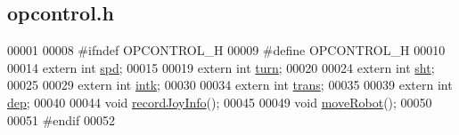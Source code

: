 \hypertarget{opcontrol_8h_source}{}\subsection{opcontrol.\+h}
\label{opcontrol_8h_source}

\begin{DoxyCode}
00001 
00008 \textcolor{preprocessor}{#ifndef OPCONTROL\_H}
00009 \textcolor{preprocessor}{#define OPCONTROL\_H}
00010 
00014 \textcolor{keyword}{extern} \textcolor{keywordtype}{int} \hyperlink{opcontrol_8h_a642ce334330c8b0f6e33dd0a3fa65111}{spd};
00015 
00019 \textcolor{keyword}{extern} \textcolor{keywordtype}{int} \hyperlink{opcontrol_8h_aaefa47f4fdf865c2358c22b542a993e4}{turn};
00020 
00024 \textcolor{keyword}{extern} \textcolor{keywordtype}{int} \hyperlink{opcontrol_8h_ab9078d4ef28960b548a1621e2f6e9438}{sht};
00025 
00029 \textcolor{keyword}{extern} \textcolor{keywordtype}{int} \hyperlink{opcontrol_8h_a0f71b6f71e93fa27c60c4dbbfc135bbb}{intk};
00030 
00034 \textcolor{keyword}{extern} \textcolor{keywordtype}{int} \hyperlink{opcontrol_8h_a7039f0d5c4b6a662294b23dccf0bea0e}{trans};
00035 
00039 \textcolor{keyword}{extern} \textcolor{keywordtype}{int} \hyperlink{opcontrol_8h_ada6c89c18e8b2a17151b9bc6b8ae060c}{dep};
00040 
00044 \textcolor{keywordtype}{void} \hyperlink{opcontrol_8h_a7e408f7d4d3cf1d5a4f6c9f1bae6e770}{recordJoyInfo}();
00045 
00049 \textcolor{keywordtype}{void} \hyperlink{opcontrol_8h_ad3b45c5807c039d0ce28bb0da06f0014}{moveRobot}();
00050 
00051 \textcolor{preprocessor}{#endif}
00052 
\end{DoxyCode}
